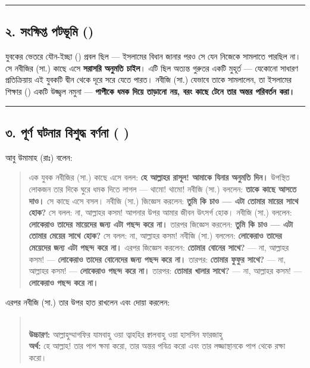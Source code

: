 \medskip\hrule\medskip

\subsection*{২. সংক্ষিপ্ত পটভূমি ()}

যুবকের ভেতরে যৌন-ইচ্ছা () প্রবল ছিল — ইসলামের বিধান জানার পরও সে যেন নিজেকে সামলাতে পারছিল না। সে নবীজির (সা.) কাছে এসে \textbf{সরাসরি অনুমতি চাইল}। এটি ছিল অত্যন্ত গুরুতর একটি মুহূর্ত — যেকোনো সাধারণ প্রতিক্রিয়ায় এই যুবকটি দ্বীন থেকে দূরে সরে যেতে পারত। নবীজি (সা.) যেভাবে তাকে সামলালেন, তা ইসলামের শিক্ষার () একটি উজ্জ্বল নমুনা — \textbf{পাপীকে ধমক দিয়ে তাড়ানো নয়, বরং কাছে টেনে তার অন্তর পরিবর্তন করা।}

\medskip\hrule\medskip

\subsection*{৩. পূর্ণ ঘটনার বিশুদ্ধ বর্ণনা (  )}

আবু উমামাহ (রাঃ) বলেন:

\begin{quote}
এক যুবক নবীজির (সা.) কাছে এসে বলল: \textbf{হে আল্লাহর রাসূল! আমাকে যিনার অনুমতি দিন।} উপস্থিত লোকজন তার দিকে ঘুরে ধমক দিতে লাগল — থামো! থামো! নবীজি (সা.) বললেন: \textbf{তাকে কাছে আসতে দাও।} সে কাছে এসে বসল। নবীজি (সা.) জিজ্ঞেস করলেন: \textbf{তুমি কি চাও — এটা তোমার মায়ের সাথে হোক?} সে বলল: না, আল্লাহর কসম! আপনার উপর আমার জীবন উৎসর্গ হোক। নবীজি (সা.) বললেন: \textbf{লোকেরাও তাদের মায়েদের জন্য এটা পছন্দ করে না।} তারপর জিজ্ঞেস করলেন: \textbf{তুমি কি চাও — এটা তোমার মেয়ের সাথে হোক?} সে বলল: না, আল্লাহর কসম! নবীজি (সা.) বললেন: \textbf{লোকেরাও তাদের মেয়েদের জন্য এটা পছন্দ করে না।} এরপর জিজ্ঞেস করলেন: \textbf{তোমার বোনের সাথে?} — না, আল্লাহর কসম! — \textbf{লোকেরাও তাদের বোনেদের জন্য পছন্দ করে না।} তারপর: \textbf{তোমার ফুফুর সাথে?} — না, আল্লাহর কসম! — \textbf{লোকেরাও পছন্দ করে না।} তারপর: \textbf{তোমার খালার সাথে?} — না, আল্লাহর কসম! — \textbf{লোকেরাও পছন্দ করে না।}
\end{quote}

এরপর নবীজি (সা.) তার উপর হাত রাখলেন এবং দোয়া করলেন:

\begin{quote}
\textbf{      } \\
\textbf{উচ্চারণ:} আল্লাহুম্মাগফির যামবাহু ওয়া ত্বাহহির ক্বালবাহু ওয়া হাসসিন ফারজাহু \\
\textbf{অর্থ:} হে আল্লাহ! তার পাপ ক্ষমা করো, তার অন্তর পবিত্র করো এবং তার লজ্জাস্থানকে পাপ থেকে রক্ষা করো।
\end{quote}

